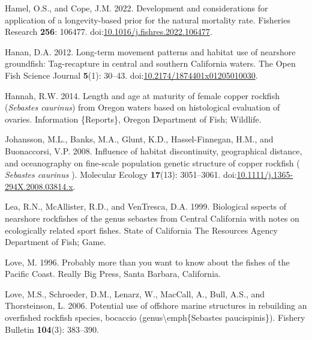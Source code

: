 \documentclass[11pt,
  english,
  letterpaper,
]{article}
\newlength{\cslhangindent}
\newenvironment{CSLReferences}[2] %
 {%
  \setlength{\parindent}{0pt}
  \ifodd #1 \everypar{\setlength{\hangindent}{\cslhangindent}}\ignorespaces\fi
  \ifnum #2 > 0
  \setlength{\parskip}{#2\baselineskip}
  \fi
 }%
 {}
\begin{document}
\begin{CSLReferences}{1}{0}
\leavevmode{}%
Hamel, O.S., and Cope, J.M. 2022. Development and considerations for application of a longevity-based prior for the natural mortality rate. Fisheries Research \textbf{256}: 106477. doi:\href{https://doi.org/10.1016/j.fishres.2022.106477}{10.1016/j.fishres.2022.106477}.

\leavevmode{}%
Hanan, D.A. 2012. Long-term movement patterns and habitat use of nearshore groundfish: Tag-recapture in central and southern {California} waters. The Open Fish Science Journal \textbf{5}(1): 30--43. doi:\href{https://doi.org/10.2174/1874401x01205010030}{10.2174/1874401x01205010030}.

\leavevmode{}%
Hannah, R.W. 2014. Length and age at maturity of female copper rockfish (\emph{{Sebastes} caurinus}) from {Oregon} waters based on histological evaluation of ovaries. Information \{Reports\}, Oregon Department of Fish; Wildlife.

\leavevmode{}%
Johansson, M.L., Banks, M.A., Glunt, K.D., Hassel-Finnegan, H.M., and Buonaccorsi, V.P. 2008. Influence of habitat discontinuity, geographical distance, and oceanography on fine-scale population genetic structure of copper rockfish ( \emph{{Sebastes} caurinus} ). Molecular Ecology \textbf{17}(13): 3051--3061. doi:\href{https://doi.org/10.1111/j.1365-294X.2008.03814.x}{10.1111/j.1365-294X.2008.03814.x}.

\leavevmode{}%
Lea, R.N., McAllister, R.D., and VenTresca, D.A. 1999. Biological sspects of nearshore rockfishes of the genus sebastes from {Central} {California} with notes on ecologically related sport fishes. State of California The Resources Agency Department of Fish; Game.

\leavevmode{}%
Love, M. 1996. Probably more than you want to know about the fishes of the {Pacific} {Coast}. Really Big Press, Santa Barbara, California.

\leavevmode{}%
Love, M.S., Schroeder, D.M., Lenarz, W., MacCall, A., Bull, A.S., and Thorsteinson, L. 2006. Potential use of offshore marine structures in rebuilding an overfished rockfish species, bocaccio (genus{\textbackslash{}}emph\{{Sebastes} paucispinis\}). Fishery Bulletin \textbf{104}(3): 383--390.


\end{CSLReferences}
\end{document}

